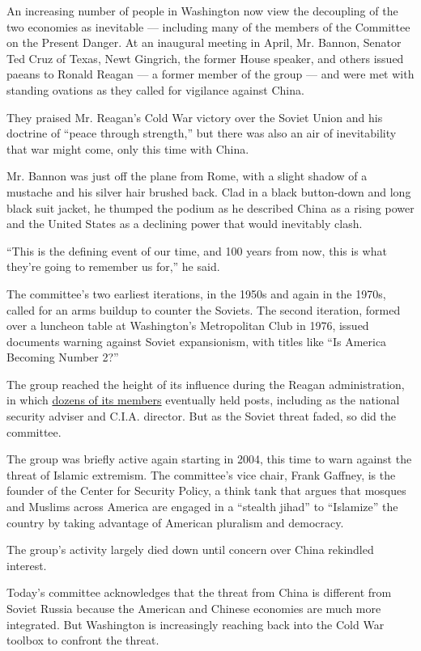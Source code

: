 An increasing number of people in Washington now view the decoupling of
the two economies as inevitable --- including many of the members of the
Committee on the Present Danger. At an inaugural meeting in April, Mr.
Bannon, Senator Ted Cruz of Texas, Newt Gingrich, the former House
speaker, and others issued paeans to Ronald Reagan --- a former member
of the group --- and were met with standing ovations as they called for
vigilance against China.

They praised Mr. Reagan's Cold War victory over the Soviet Union and his
doctrine of ``peace through strength,'' but there was also an air of
inevitability that war might come, only this time with China.

Mr. Bannon was just off the plane from Rome, with a slight shadow of a
mustache and his silver hair brushed back. Clad in a black button-down
and long black suit jacket, he thumped the podium as he described China
as a rising power and the United States as a declining power that would
inevitably clash.

``This is the defining event of our time, and 100 years from now, this
is what they're going to remember us for,'' he said.

The committee's two earliest iterations, in the 1950s and again in the
1970s, called for an arms buildup to counter the Soviets. The second
iteration, formed over a luncheon table at Washington's Metropolitan
Club in 1976, issued documents warning against Soviet expansionism, with
titles like ``Is America Becoming Number 2?''

The group reached the height of its influence during the Reagan
administration, in which
\href{https://www.nytimes.com/1981/11/23/us/group-goes-from-exile-to-influence.html}{dozens
of its members} eventually held posts, including as the national
security adviser and C.I.A. director. But as the Soviet threat faded, so
did the committee.

The group was briefly active again starting in 2004, this time to warn
against the threat of Islamic extremism. The committee's vice chair,
Frank Gaffney, is the founder of the Center for Security Policy, a think
tank that argues that mosques and Muslims across America are engaged in
a ``stealth jihad'' to ``Islamize'' the country by taking advantage of
American pluralism and democracy.

The group's activity largely died down until concern over China
rekindled interest.

Today's committee acknowledges that the threat from China is different
from Soviet Russia because the American and Chinese economies are much
more integrated. But Washington is increasingly reaching back into the
Cold War toolbox to confront the threat.

